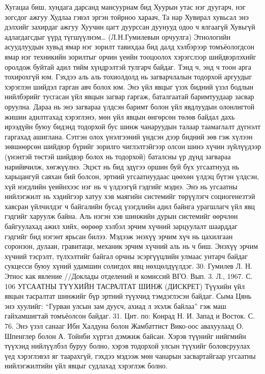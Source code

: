 Хугацаа биш, хундага дарсанд мансуурнам бид
Хуурын утас нэг дуугарч, нэг зогсдог ажгуу
Худлаа гэвэл эргэн тойрноо хараач, Та нар
Хувирал хувьсал энэ дэлхийг захирдаг ажгуу
Хуучин цагт дуурссан дуунууд одоо ч ялгаагүй
Хувьгүй адлагдагсдыг үүрд түгшүүлнэм…
(Л.Н.Гумилевын орчуулга)
Этнологийн асуудлуудын хувьд ямар нэг зорилт тавихдаа бид далд хэлбэрээр томъёологдсон ямар нэг техникийн зорилтыг орчин үеийн тооцоолох хэрэгслээр шийдвэрлэхийг оролдож буйтай адил тийм хүндрэлтэй тулгарч байдаг. Тэнд ч, энд ч тоон арга тохирохгүй юм. Гэхдээ аль аль тохиолдолд нь загварчлалын тодорхой аргуудыг хэрэглэн шийдэл гарган авч болох юм. Энэ үйл явцыг үзэх бидний үзэл бодлын нийлбэрийг тусгасан үйл явцын загвар гаргаж, баталгаатай баримтуудаар засвар оруулна. Дараа нь энэ загвараа үлдсэн баримт болон үйл явдлуудын олонлигтой жишин адилтгахад хэрэглэнэ, мөн үйл явцын өнгөрсөн төлөв байдал дахь ирээдүйн буюу бидэнд тодорхой бус шинж чанаруудын талаар таамаглалт дүгнэлт гаргахад ашиглана. Сэтгэн олох үнэлгээний үндсэн дээр бидний зөв гэж хүлээн зөвшөөрсөн шийдвэр бүрийг зорилго чиглэлтэйгээр олсон шинэ хүчин зүйлүүдээр (үнэнтэй төстэй шийдвэр болох нь тодорхой) баталсны үр дүнд загвараа нарийвчилж, хөгжүүлнэ.
Эцэст нь бид эдүгээ оршин буй бүх угсаатнууд нь харьцангуй саяхан бий болсон, эртний угсаатнуудаас цөөхөн үлдэц бүтэн үлдсэн, хүй нэгдлийн үеийнхээс нэг нь ч үлдээгүй гэдгийг мэднэ. Энэ нь угсаатны нийлэгжилт нь хэдийгээр хатуу хэв маягийн системийг төрүүлэгч социогенезтэй хавсран үйлчилдэг ч байгалийн бусад үзэгдлийн адил байнга урагшлагч үйл явц гэдгийг харуулж байна.
Аль нэгэн хэв шинжийн дурын системийг өөрчлөн байгуулахад ажил хийх, өөрөөр хэлбэл эрчим хүчний зарцуулалт шаарддаг гэдгийг бид нэгэнт ярьсан билээ. Мэдээж энэхүү эрчим хүч нь цахилгаан соронзон, дулаан, гравитаци, механик эрчим хүчний аль нь ч биш. Энэхүү эрчим хүчний тэсрэлт, түлхэлтийг байгал орчны эсэргүүцлийн улмаас унтарч байдаг сукцесси буюу хүний удамшин солигдох явц нөхцөлдүүлдэг. 30. Гумилев Л. Н. Этнос как явление //Доклады отделений и комиссий ВГО. Вып. 3. Л., 1967. С. 106
УГСААТНЫ ТҮҮХИЙН ТАСРАЛТАТ ШИНЖ (ДИСКРЕТ)
Түүхийн үйл явцын тасралтат шинжийг бүр эртний түүхчид тэмдэглэсэн байдаг. Сыма Цянь энэ хуулийг: “Гурван улсын зам дуусч, ахиад л эхэлж байлаа” гэж маш гайхамшигтай томъёолсон байдаг. 31. Цит. по: Конрад Н. И. Запад и Восток. С. 76.
Энэ үзэл санааг Ибн Халдуна болон Жамбаттист Вико-оос авахуулаад О. Шпенглер болон А. Тойнби хүртэл дэмжиж байсан. Хэрэв түүнийг нийгмийн түүхэнд нийлүүлбэл буруу болно, хэрэв тодорхой улсын түүхийг боловсруулах үед хэрэглэвэл яг таарахгүй, гэхдээ мэдээж мөн чанарын засвартайгаар угсаатны нийлэгжилтийн үйл явцыг судлахад хэрэглэж болно.
